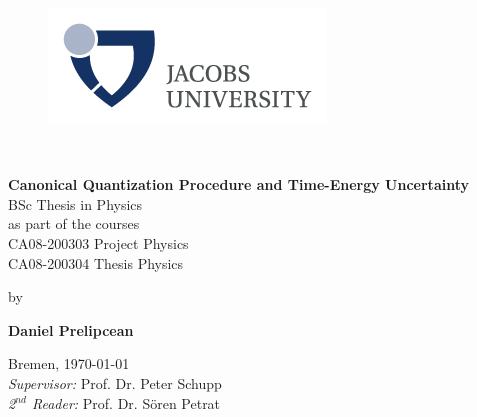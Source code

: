 \documentclass[twoside,a4paper,11pt]{article}
\numberwithin{equation}{section}
\begin{document}



\begin{titlepage}
 
\begin{center}
 
\begin{figure}[H]
\centering
\includegraphics[width=0.4\linewidth]{Pics/jacobslogo.jpg}
\end{figure}
\vspace{10mm}
\LARGE
{} \\
 
\vspace{25mm}
\textbf{\huge{Canonical Quantization Procedure and Time-Energy Uncertainty}} \\
 
\vspace{30mm}
\Large{BSc Thesis in Physics}\\
\vspace{10mm}
\large{as part of the courses}\\
\vspace{5mm}
\large{CA08-200303 Project Physics \\ CA08-200304 Thesis Physics}\\
\vspace{7.5mm}

by \\
\vspace{7.5mm}

\Large{\textbf{Daniel Prelipcean}}
\end{center}

\vfill

\large{Bremen, \today\\
\textit{Supervisor:} Prof. Dr. Peter Schupp\\
\textit{2$^{nd}$ Reader:} Prof. Dr. S{\"o}ren Petrat}


\vspace{2cm}

\end{titlepage}


 \newpage
	
\end{document}
